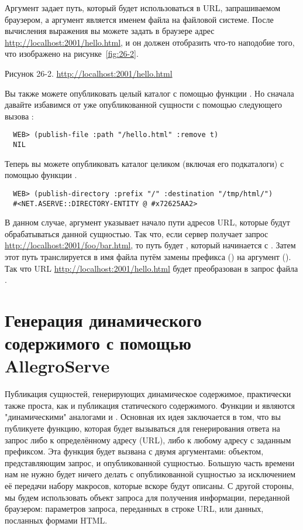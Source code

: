 Аргумент  задает путь, который будет использоваться в URL, запрашиваемом
браузером, а аргумент  является именем файла на файловой системе. После
вычисления выражения  вы можете задать в браузере адрес
\url{http://localhost:2001/hello.html}, и он должен отобразить что-то наподобие того, что
изображено на рисунке~\ref{fig:26-2}.

Рисунок 26-2. \url{http://localhost:2001/hello.html}

Вы также можете опубликовать целый каталог с помощью функции . Но
сначала давайте избавимся от уже опубликованной сущности с помощью следующего вызова
:

\begin{lstlisting}
  WEB> (publish-file :path "/hello.html" :remove t)
  NIL
\end{lstlisting}

Теперь вы можете опубликовать каталог  целиком (включая его подкаталоги)
с помощью функции .

\begin{lstlisting}
  WEB> (publish-directory :prefix "/" :destination "/tmp/html/")
  #<NET.ASERVE::DIRECTORY-ENTITY @ #x72625AA2>
\end{lstlisting}

В данном случае, аргумент  указывает начало пути адресов URL, которые будут
обрабатываться данной сущностью. Так что, если сервер получает запрос
\url{http://localhost:2001/foo/bar.html}, то путь будет , который
начинается с \code{/}. Затем этот путь транслируется в имя файла путём замены префикса
(\code{/}) на аргумент  (). Так что URL
\url{http://localhost:2001/hello.html} будет преобразован в запрос файла
.

\section{Генерация динамического содержимого с помощью AllegroServe}

Публикация сущностей, генерирующих динамическое содержимое, практически также проста, как
и публикация статического содержимого. Функции  и 
являются "динамическими" аналогами  и
. Основная их идея заключается в том, что вы публикуете функцию,
которая будет вызываться для генерирования ответа на запрос либо к определённому адресу
(URL), либо к любому адресу с заданным префиксом. Эта функция будет вызвана с двумя
аргументами: объектом, представляющим запрос, и опубликованной сущностью. Большую часть
времени нам не нужно будет ничего делать с опубликованной сущностью за исключением её
передачи набору макросов, которые вскоре будут описаны. С другой стороны, мы будем
использовать объект запроса для получения информации, переданной браузером: параметров
запроса, переданных в строке URL, или данных, посланных формами HTML.

